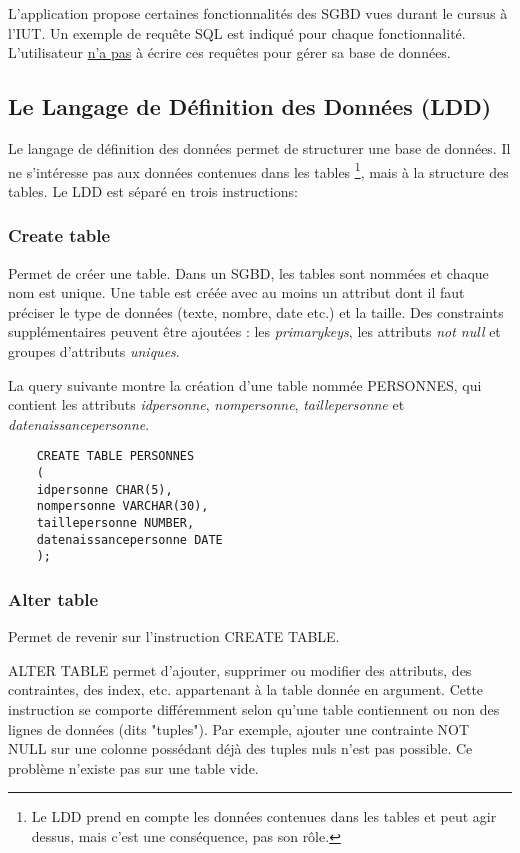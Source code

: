 L'application propose certaines fonctionnalités des SGBD vues durant le cursus à l'IUT.
Un exemple de requête SQL est indiqué pour chaque fonctionnalité.
L'utilisateur \underline{n'a pas} à écrire ces requêtes pour gérer sa base de données.

\subsection{Le Langage de Définition des Données (LDD)}
Le langage de définition des données permet de structurer une base de données.
Il ne s'intéresse pas aux données contenues dans les tables
\footnote{\label{interet_ldd}Le LDD prend en compte les données contenues dans les tables et peut agir dessus, mais c'est une conséquence, pas son rôle.}, mais à la structure des tables. Le LDD est séparé en trois instructions:

\subsubsection{Create table}
Permet de créer une \gls{table}. Dans un SGBD, les tables sont nommées et chaque nom est unique.
Une table est créée avec au moins un attribut dont il faut préciser le type de données (texte, nombre, date etc.) et la taille.
Des \glspl{constraint} supplémentaires peuvent être ajoutées : les \textit{\glspl{primarykey}}, les attributs \textit{not null} et groupes d'attributs \textit{uniques}.

La \gls{query} suivante montre la création d'une table nommée PERSONNES, qui contient les attributs \textit{idpersonne}, \textit{nompersonne}, \textit{taillepersonne} et \textit{datenaissancepersonne}.

  \begin{lstlisting}
    CREATE TABLE PERSONNES
    (
    idpersonne CHAR(5),
    nompersonne VARCHAR(30),
    taillepersonne NUMBER,
    datenaissancepersonne DATE
    );
  \end{lstlisting}

\subsubsection{Alter table}
Permet de revenir sur l'instruction CREATE TABLE.

ALTER TABLE permet d'ajouter, supprimer ou modifier des \glspl{attribut}, des contraintes, des index, etc. appartenant à la table donnée en argument.
Cette instruction se comporte différemment selon qu'une table contiennent ou non des lignes de données (dits "\glspl{tuple}").
Par exemple, ajouter une contrainte NOT NULL sur une colonne possédant déjà des tuples nuls n'est pas possible.
Ce problème n'existe pas sur une table vide.

